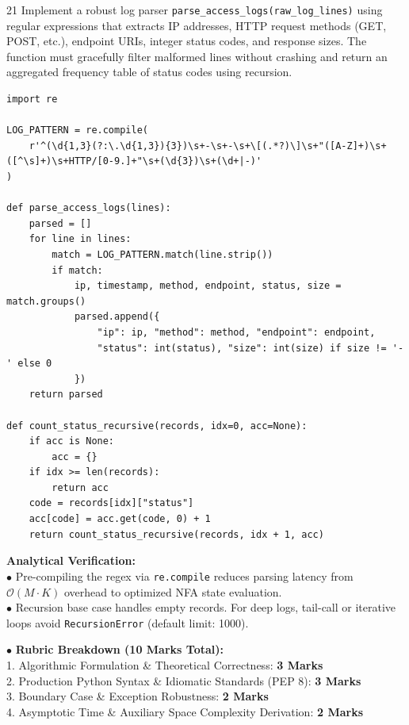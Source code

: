 \begin{subjectiveq}{2}{1}
Implement a robust log parser \texttt{parse\_access\_logs(raw\_log\_lines)} using regular expressions that extracts IP addresses, HTTP request methods (GET, POST, etc.), endpoint URIs, integer status codes, and response sizes. The function must gracefully filter malformed lines without crashing and return an aggregated frequency table of status codes using recursion.
\end{subjectiveq}

\begin{solbox}
\begin{lstlisting}
import re

LOG_PATTERN = re.compile(
    r'^(\d{1,3}(?:\.\d{1,3}){3})\s+-\s+-\s+\[(.*?)\]\s+"([A-Z]+)\s+([^\s]+)\s+HTTP/[0-9.]+"\s+(\d{3})\s+(\d+|-)'
)

def parse_access_logs(lines):
    parsed = []
    for line in lines:
        match = LOG_PATTERN.match(line.strip())
        if match:
            ip, timestamp, method, endpoint, status, size = match.groups()
            parsed.append({
                "ip": ip, "method": method, "endpoint": endpoint,
                "status": int(status), "size": int(size) if size != '-' else 0
            })
    return parsed

def count_status_recursive(records, idx=0, acc=None):
    if acc is None:
        acc = {}
    if idx >= len(records):
        return acc
    code = records[idx]["status"]
    acc[code] = acc.get(code, 0) + 1
    return count_status_recursive(records, idx + 1, acc)
\end{lstlisting}
\textbf{Analytical Verification:}\\
$\bullet$ Pre-compiling the regex via \texttt{re.compile} reduces parsing latency from $\mathcal{O}(M \cdot K)$ overhead to optimized NFA state evaluation.\\
$\bullet$ Recursion base case handles empty records. For deep logs, tail-call or iterative loops avoid \texttt{RecursionError} (default limit: 1000).
\end{solbox}

\begin{examinertip}
$\bullet$ \textbf{Rubric Breakdown (10 Marks Total):}\\
1. Algorithmic Formulation \& Theoretical Correctness: \textbf{3 Marks}\\
2. Production Python Syntax \& Idiomatic Standards (PEP 8): \textbf{3 Marks}\\
3. Boundary Case \& Exception Robustness: \textbf{2 Marks}\\
4. Asymptotic Time \& Auxiliary Space Complexity Derivation: \textbf{2 Marks}
\end{examinertip}
